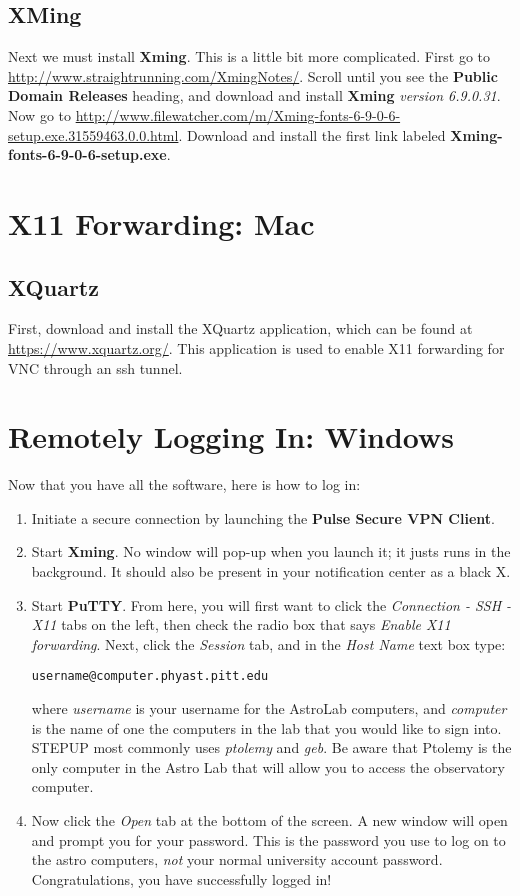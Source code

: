 \documentclass[11pt]{article}
\begin{document}
\subsection{XMing}
Next we must install \textbf{Xming}. This is a little bit more complicated. First go to \url{http://www.straightrunning.com/XmingNotes/}.
Scroll until you see the \textbf{Public Domain Releases} heading, and download and install \textbf{Xming} \emph{version 6.9.0.31}. Now go to \url{http://www.filewatcher.com/m/Xming-fonts-6-9-0-6-setup.exe.31559463.0.0.html}. Download and install the first link labeled \textbf{Xming-fonts-6-9-0-6-setup.exe}.

\section{X11 Forwarding: Mac}
\subsection{XQuartz}
First, download and install the XQuartz application, which can be found at \url{https://www.xquartz.org/}. This application is used to enable X11 forwarding for VNC through an ssh tunnel.


\section{Remotely Logging In: Windows}
Now that you have all the software, here is how to log in:
\begin{enumerate}
\item Initiate a secure connection by launching the \textbf{Pulse Secure VPN Client}.

\item Start \textbf{Xming}. No window will pop-up when you launch it; it justs runs in the background. It should also be present in your notification center as a black X.
\item Start \textbf{PuTTY}. From here, you will first want to click the \emph{Connection - SSH - X11} tabs on the left, then check the radio box that says \emph{Enable X11 forwarding}. Next, click the \emph{Session} tab, and in the \emph{Host Name} text box type:

\begin{verbatim}
username@computer.phyast.pitt.edu
\end{verbatim}

where \emph{username} is your username for the AstroLab computers, and \emph{computer} is the name of one the computers in the lab that you would like to sign into. STEPUP most commonly uses \emph{ptolemy} and \emph{geb}. Be aware that Ptolemy is the only computer in the Astro Lab that will allow you to access the observatory computer. 
\item Now click the \emph{Open} tab at the bottom of the screen. A new window will open and prompt you for your password. This is the password you use to log on to the astro computers, \emph{not} your normal university account password. Congratulations, you have successfully logged in!
\end{enumerate}
\end{document}

